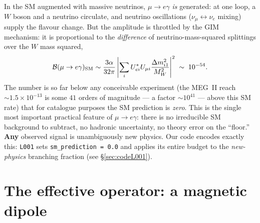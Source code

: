 \documentclass[11pt]{article}
\newcommand{\BR}{\mathcal{B}}
\newcommand{\code}[1]{\texttt{#1}}
\theoremstyle{definition}
\begin{document}
In the SM augmented with massive neutrinos, $\mu\to e\gamma$ \emph{is} generated:
at one loop, a $W$ boson and a neutrino circulate, and neutrino oscillations
($\nu_\mu \leftrightarrow \nu_e$ mixing) supply the flavour change. But the
amplitude is throttled by the GIM mechanism: it is proportional to the
\emph{difference} of neutrino-mass-squared splittings over the $W$ mass squared,
\begin{equation}
\BR(\mu\to e\gamma)_{\rm SM} \sim \frac{3\alpha}{32\pi}
   \left|\sum_i U^*_{ei}U_{\mu i}\frac{\Delta m^2_{i1}}{M_W^2}\right|^2
   \;\sim\; 10^{-54}.
\label{eq:smrate}
\end{equation}
The number is so far below any conceivable experiment (the MEG~II reach
$\sim 1.5\times10^{-13}$ is some $41$ orders of magnitude --- a factor
$\sim 10^{41}$ --- above this SM rate) that for catalogue purposes the SM
prediction is \emph{zero}. This is the single most important practical feature of
$\mu\to e\gamma$: there is no irreducible SM background to subtract, no hadronic
uncertainty, no theory error on the ``floor.'' \textbf{Any} observed signal is
unambiguously new physics. Our code encodes exactly this: \code{L001} sets
\code{sm\_prediction = 0.0} and applies its entire budget to the
\emph{new-physics} branching fraction (see \S\ref{sec:codeL001}).

\section{The effective operator: a magnetic dipole}
\label{sec:operator}
\end{document}
